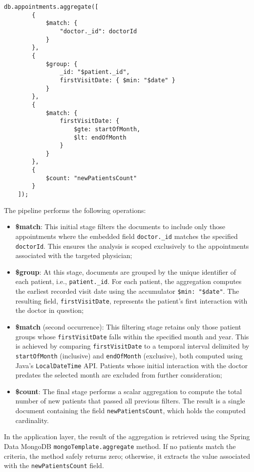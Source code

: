 \begin{lstlisting}[language=mongodb]
	db.appointments.aggregate([
		{
			$match: {
				"doctor._id": doctorId
			}
		},
		{
			$group: {
				_id: "$patient._id",
				firstVisitDate: { $min: "$date" }
			}
		},
		{
			$match: {
				firstVisitDate: {
					$gte: startOfMonth,
					$lt: endOfMonth
				}
			}
		},
		{
			$count: "newPatientsCount"
		}
	]);
\end{lstlisting}

The pipeline performs the following operations:

\begin{itemize}
	\item \textbf{\$match}: This initial stage filters the documents to include only those appointments where the embedded field \texttt{doctor.\_id} matches the specified \texttt{doctorId}. This ensures the analysis is scoped exclusively to the appointments associated with the targeted physician;
		
	\item \textbf{\$group}: At this stage, documents are grouped by the unique identifier of each patient, i.e., \texttt{patient.\_id}. For each patient, the aggregation computes the earliest recorded visit date using the accumulator \texttt{\$min: "\$date"}. The resulting field, \texttt{firstVisitDate}, represents the patient's first interaction with the doctor in question;
		
	\item \textbf{\$match} (second occurrence): This filtering stage retains only those patient groups whose \texttt{firstVisitDate} falls within the specified month and year. This is achieved by comparing \texttt{firstVisitDate} to a temporal interval delimited by \texttt{startOfMonth} (inclusive) and \texttt{endOfMonth} (exclusive), both computed using Java's \texttt{LocalDateTime} API. Patients whose initial interaction with the doctor predates the selected month are excluded from further consideration;
	
	\item \textbf{\$count}: The final stage performs a scalar aggregation to compute the total number of new patients that passed all previous filters. The result is a single document containing the field \texttt{newPatientsCount}, which holds the computed cardinality.
	
\end{itemize}

In the application layer, the result of the aggregation is retrieved using the Spring Data MongoDB \texttt{mongoTemplate.aggregate} method. If no patients match the criteria, the method safely returns zero; otherwise, it extracts the value associated with the \texttt{newPatientsCount} field.

